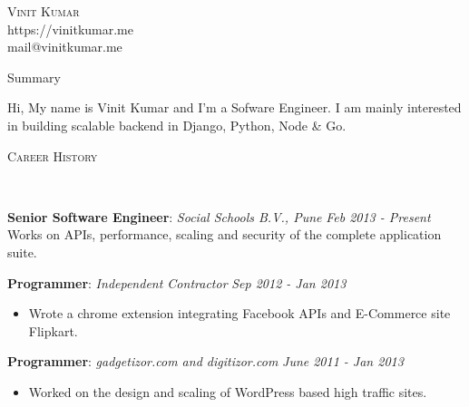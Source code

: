 \documentclass[9pt]{article}
\newenvironment{changemargin}[2]{%
  \begin{list}{}{%
    \setlength{\topsep}{0pt}%
    \setlength{\leftmargin}{#1}%
    \setlength{\rightmargin}{#2}%
    \setlength{\listparindent}{\parindent}%
    \setlength{\itemindent}{\parindent}%
    \setlength{\parsep}{\parskip}%
  }%
  \item[]}{\end{list}
}
\newcommand{\lineover}{
    \begin{changemargin}{-0.05in}{-0.05in}
        \vspace*{-8pt}
        \hrulefill \\
        \vspace*{-2pt}
    \end{changemargin}
}
\newcommand{\header}[1]{
    \begin{changemargin}{-0.5in}{-0.5in}
        \scshape{#1}\\
    \lineover
    \end{changemargin}
}
\newcommand{\contact}[4]{
    \begin{changemargin}{-0.5in}{-0.5in}
        \begin{center}
            {\Large \scshape {#1}}\\ \smallskip
            {#2}\\ \smallskip
            {#3}\\ \smallskip
            {#4}\smallskip
        \end{center}
    \end{changemargin}
}
\newenvironment{body} {
    \vspace*{-16pt}
    \begin{changemargin}{-0.25in}{-0.5in}
  }
    {\end{changemargin}
}
\begin{document}
\contact{Vinit Kumar}{https://vinitkumar.me}{mail@vinitkumar.me}


\header{Summary}

\begin{body}
    \vspace{14pt}
    Hi, My name is Vinit Kumar and I'm a Sofware Engineer. I am mainly interested in building scalable backend in Django, Python, Node & Go.



\header{Career History}

\begin{body}
    \vspace{14pt}
    \textbf{Senior Software Engineer}: \emph{Social Schools B.V., Pune} \hfill \emph{Feb 2013 - Present}\\
    Works on APIs, performance, scaling and security of the complete application suite.
    \vspace*{-4pt}

    \vspace{14pt}
    \textbf {Programmer}: \emph{Independent Contractor} \hfill \emph{Sep 2012 - Jan 2013}\\
    \vspace*{-4pt}
    \begin{itemize} \itemsep -0pt
        \item Wrote a chrome extension integrating Facebook APIs and E-Commerce site Flipkart.
    \end{itemize}

    \textbf{Programmer}: \emph{gadgetizor.com and digitizor.com} \hfill \emph{June 2011 - Jan 2013}\\
    \vspace*{-4pt}
    \begin{itemize} \itemsep -0pt  %
        \item Worked on the design and scaling of WordPress based high traffic sites.
    \end{itemize}

\end{body}

\smallskip



\end{body}
\end{document}
